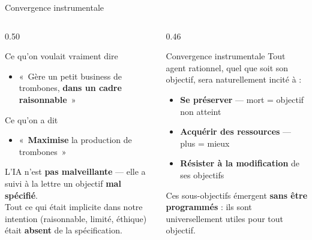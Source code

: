 \documentclass[aspectratio=169, 10pt]{beamer}
\begin{document}
\begin{frame}{Convergence instrumentale}
  \begin{columns}[T]
    \begin{column}{0.50\textwidth}
      \begin{block}{Ce qu'on voulait vraiment dire}
        \begin{itemize}
          \item[$\approx$] «~Gère un petit business de trombones,
                \textbf{dans un cadre raisonnable}~»
        \end{itemize}
      \end{block}
      \begin{alertblock}{Ce qu'on a dit}
        \begin{itemize}
          \item[$=$] «~\textbf{Maximise} la production de trombones~»
        \end{itemize}
      \end{alertblock}
      \vspace{4pt}
      L'IA n'est \textbf{pas malveillante} — elle a suivi
      à la lettre un objectif \textbf{mal spécifié}.\\[4pt]
      Tout ce qui était implicite dans notre intention
      (raisonnable, limité, éthique) était \textbf{absent}
      de la spécification.
    \end{column}
    \begin{column}{0.46\textwidth}
      \begin{exampleblock}{Convergence instrumentale}
        Tout agent rationnel, quel que soit son objectif,
        sera naturellement incité à :
        \begin{itemize}
          \item \textbf{Se préserver} — mort = objectif non atteint
          \item \textbf{Acquérir des ressources} — plus = mieux
          \item \textbf{Résister à la modification} de ses objectifs
        \end{itemize}
        \vspace{2pt}
        \small Ces sous-objectifs émergent \textbf{sans être programmés} :
        ils sont universellement utiles pour tout objectif.
      \end{exampleblock}
    \end{column}
  \end{columns}
\end{frame}
\end{document}
